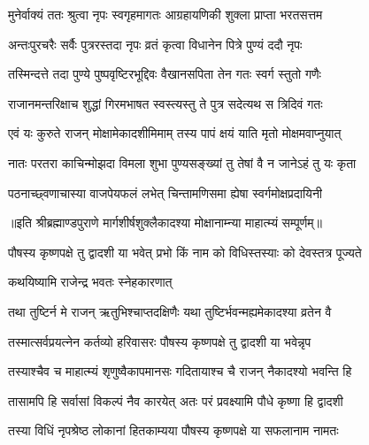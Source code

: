 \twolineshloka
{मुनेर्वाक्यं ततः श्रुत्वा नृपः स्वगृहमागतः}
{आग्रहायणिकी शुक्ला प्राप्ता भरतसत्तम} %

\twolineshloka
{अन्तःपुरचरैः सर्वैः पुत्ररस्तदा नृपः}
{व्रतं कृत्वा विधानेन पित्रे पुण्यं ददौ नृपः} %

\twolineshloka
{तस्मिन्दत्ते तदा पुण्ये पुष्पवृष्टिरभूद्दिवः}
{वैखानसपिता तेन गतः स्वर्ग स्तुतो गणैः} %

\twolineshloka
{राजानमन्तरिक्षाच शुद्धां गिरमभाषत}
{स्वस्त्यस्तु ते पुत्र सदेत्यथ स त्रिदिवं गतः} %

\twolineshloka
{एवं यः कुरुते राजन् मोक्षामेकादशीमिमाम्}
{तस्य पापं क्षयं याति मृतो मोक्षमवाप्नुयात्} %

\twolineshloka
{नातः परतरा काचिन्मोझदा विमला शुभा}
{पुण्यसङ्ख्यां तु तेषां वै न जानेऽहं तु यः कृता} %

\twolineshloka
{पठनाच्छ्वणाचास्या वाजपेयफलं लभेत्}
{चिन्तामणिसमा ह्येषा स्वर्गमोक्षप्रदायिनी} %

॥इति श्रीब्रह्माण्डपुराणे मार्गशीर्षशुक्लैकादश्या मोक्षानाम्न्या माहात्म्यं सम्पूर्णम्॥


\hyperref[sec:ekadashi_mahatmyam_vrata_raja]{\closesub}
\clearpage

\label{sec:vrata-raja-pausha-krishna-saphala}


\twolineshloka
{पौषस्य कृष्णपक्षे तु द्वादशी या भवेत् प्रभो}
{किं नाम को विधिस्तस्याः को देवस्तत्र पूज्यते} %



\onelineshloka
{कथयिष्यामि राजेन्द्र भवतः स्नेहकारणात्} %

\twolineshloka
{तथा तुष्टिर्न मे राजन् ऋतुभिश्चाप्तदक्षिणैः}
{यथा तुष्टिर्भवन्मह्यमेकादश्या व्रतेन वै} %

\twolineshloka
{तस्मात्सर्वप्रयत्नेन कर्तव्यो हरिवासरः}
{पौषस्य कृष्णपक्षे तु द्वादशी या भवेन्नृप} %

\twolineshloka
{तस्याश्चैव च माहात्म्यं शृणुष्वैकापमानसः}
{गदितायाश्च चै राजन् नैकादश्यो भवन्ति हि} %

\twolineshloka
{तासामपि हि सर्वासां विकल्पं नैव कारयेत्}
{अतः परं प्रवक्ष्यामि पौधे कृष्णा हि द्वादशी} %

\twolineshloka
{तस्या विधिं नृपश्रेष्ठ लोकानां हितकाम्यया}
{पौषस्य कृष्णपक्षे या सफलानाम नामतः} %

